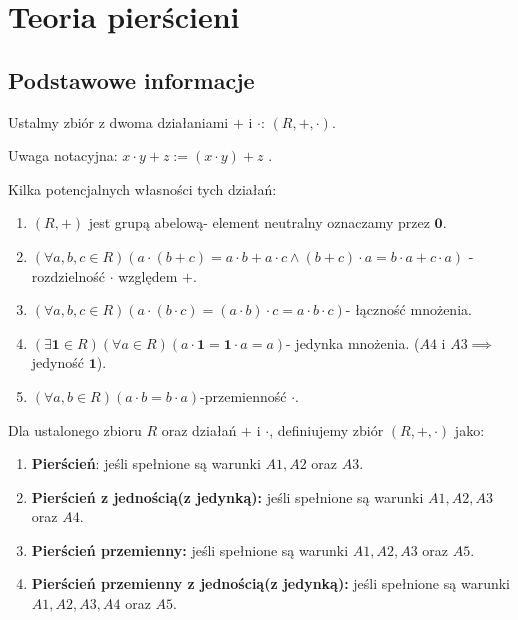 \chapter{Teoria pierścieni}


\section{Podstawowe informacje}

Ustalmy zbiór z dwoma działaniami $+$ i $\cdot $: $\left( R, +,  \cdot  \right) $.

Uwaga notacyjna: $x\cdot y + z := \left( x\cdot y \right) + z$ .

Kilka potencjalnych własności tych działań:
\begin{enumerate}[label=A\arabic*.]
	\item $\left( R, + \right) $ jest grupą abelową- element neutralny oznaczamy przez $\mathbf{0}$.
	\item $\left(\forall a,b,c \in R \right)\left( a\cdot \left( b+c \right) = a\cdot b + a\cdot c \land (b+c)\cdot a = b\cdot a + c\cdot a\right) $ -rozdzielność $\cdot $ względem $+$.
	\item $\left(\forall a,b,c\in R \right) \left( a\cdot \left( b\cdot c \right) = \left( a\cdot b \right) \cdot c = a\cdot b\cdot c \right) $- łączność mnożenia.
	\item $\left(\exists \mathbf{1}\in R \right)\left(\forall a\in R \right)\left( a\cdot \mathbf{1} = \mathbf{1}\cdot a = a\right)$- jedynka mnożenia.  ($A4 \text{ i } A3 \implies $ jedyność $\mathbf{1}$).
	\item $\left(\forall a,b\in R \right)\left( a\cdot b = b\cdot a\right)  $-przemienność $\cdot $.
\end{enumerate}
\begin{definition}[Pierścień]
	Dla ustalonego zbioru $R$ oraz działań $+$ i $\cdot $, definiujemy zbiór $\left( R, +, \cdot  \right) $ jako:
	\begin{enumerate}[label=\arabic*.]
		\item \textbf{Pierścień}: jeśli spełnione są warunki $A1, A2$ oraz $A3$.
		\item  \textbf{Pierścień z jednością(z jedynką):} jeśli spełnione są warunki $A1, A2, A3$ oraz $A4$.
		\item \textbf{Pierścień przemienny:} jeśli spełnione są warunki $A1, A2, A3$ oraz $A5$.
		\item \textbf{Pierścień przemienny z jednością(z jedynką):} jeśli spełnione są warunki $A1, A2, A3, A4$ oraz $A5$.
	\end{enumerate}
\end{definition} 

